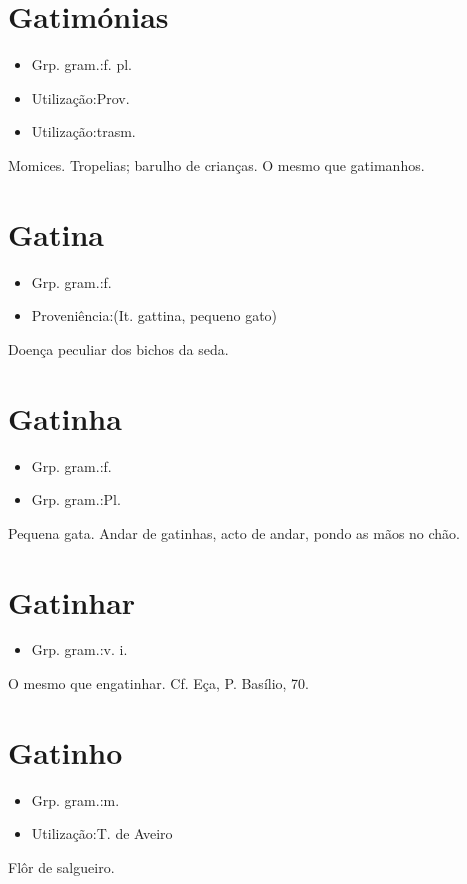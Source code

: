 \section{Gatimónias}
\begin{itemize}
\item {Grp. gram.:f. pl.}
\end{itemize}
\begin{itemize}
\item {Utilização:Prov.}
\end{itemize}
\begin{itemize}
\item {Utilização:trasm.}
\end{itemize}
Momices.
Tropelias; barulho de crianças.
O mesmo que \textunderscore gatimanhos\textunderscore .
\section{Gatina}
\begin{itemize}
\item {Grp. gram.:f.}
\end{itemize}
\begin{itemize}
\item {Proveniência:(It. \textunderscore gattina\textunderscore , pequeno gato)}
\end{itemize}
Doença peculiar dos bichos da seda.
\section{Gatinha}
\begin{itemize}
\item {Grp. gram.:f.}
\end{itemize}
\begin{itemize}
\item {Grp. gram.:Pl.}
\end{itemize}
Pequena gata.
\textunderscore Andar de gatinhas\textunderscore , acto de andar, pondo as mãos no chão.
\section{Gatinhar}
\begin{itemize}
\item {Grp. gram.:v. i.}
\end{itemize}
O mesmo que \textunderscore engatinhar\textunderscore . Cf. Eça, \textunderscore P. Basílio\textunderscore , 70.
\section{Gatinho}
\begin{itemize}
\item {Grp. gram.:m.}
\end{itemize}
\begin{itemize}
\item {Utilização:T. de Aveiro}
\end{itemize}
Flôr de salgueiro.
